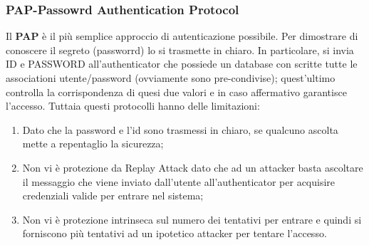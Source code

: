 \documentclass{article}
\theoremstyle{remark}
\begin{document}
\subsubsection{PAP-Passowrd Authentication Protocol}
Il \textbf{PAP} è il più semplice approccio di autenticazione possibile. Per dimostrare di conoscere il segreto (passworrd) lo si trasmette in chiaro. In particolare, si invia ID e PASSWORD all'authenticator che possiede un database con scritte tutte le associationi utente/password (ovviamente sono pre-condivise); quest'ultimo controlla la corrispondenza di quesi due valori e in caso affermativo garantisce l'accesso.\newline
Tuttaia questi protocolli hanno delle limitazioni:\begin{enumerate}
	\item Dato che la password e l'id sono trasmessi in chiaro, se qualcuno ascolta mette a repentaglio la sicurezza;
	\item Non vi è protezione da Replay Attack dato che ad un attacker basta ascoltare il messaggio che viene inviato dall'utente all'authenticator per acquisire credenziali valide  per entrare nel sistema;
	\item Non vi è protezione intrinseca sul numero dei tentativi per entrare e quindi si forniscono più tentativi ad un ipotetico attacker per tentare l'accesso.
\end{enumerate}
\end{document}
